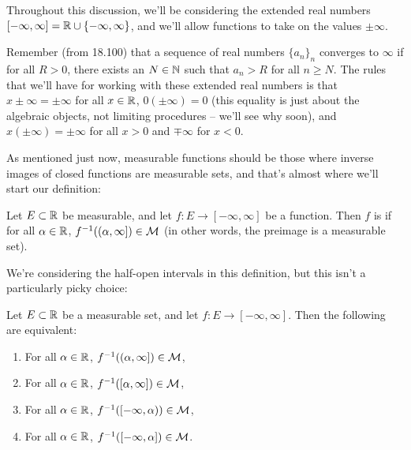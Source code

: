 \begin{fact}
Throughout this discussion, we'll be considering the extended real numbers $[-\infty, \infty] = \mathbb R \cup \{-\infty, \infty\}$, and we'll allow functions to take on the values $\pm \infty$. 
\end{fact}

Remember (from 18.100) that a sequence of real numbers $\{a_n\}_n$ converges to $\infty$ if for all $R > 0$, there exists an $N \in \mathbb N$ such that $a_n > R$ for all $n \ge N$. The rules that we'll have for working with these extended real numbers is that $x \pm \infty = \pm \infty$ for all $x \in \mathbb R$, $0 (\pm \infty) = 0$ (this equality is just about the algebraic objects, not limiting procedures -- we'll see why soon), and $x(\pm \infty) = \pm \infty$ for all $x > 0$ and $\mp \infty$ for $x < 0$.

As mentioned just now, measurable functions should be those where inverse images of closed functions are measurable sets, and that's almost where we'll start our definition:

\begin{definition}
Let $E \subset \mathbb R$ be measurable, and let $f: E \to [-\infty, \infty]$ be a function. Then $f$ is  if for all $\alpha \in \mathbb R$, $f^{-1}((\alpha, \infty]) \in \mathcal{M}$ (in other words, the preimage is a measurable set).
\end{definition}

We're considering the half-open intervals in this definition, but this isn't a particularly picky choice:

\begin{theorem}\label{fourmeasureequiv}
Let $E \subset \mathbb R$ be a measurable set, and let $f: E \to [-\infty, \infty]$. Then the following are equivalent:
\begin{enumerate}
\item For all $\alpha \in \mathbb R$, $f^{-1}((\alpha, \infty]) \in \mathcal{M}$,
\item For all $\alpha \in \mathbb R$, $f^{-1}([\alpha, \infty]) \in \mathcal{M}$,
\item For all $\alpha \in \mathbb R$, $f^{-1}([-\infty, \alpha)) \in \mathcal{M}$,
\item For all $\alpha \in \mathbb R$, $f^{-1}([-\infty, \alpha]) \in \mathcal{M}$.
\end{enumerate}
\end{theorem}

